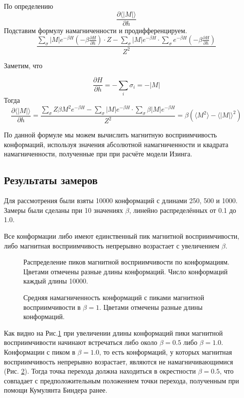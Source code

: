 \documentclass[a4paper,12pt]{article}
\begin{document}
По определению
\[
\frac{\partial\langle |M|\rangle}{\partial h}
\]
Подставим формулу намагниченности и продифференцируем.
\[
\frac{\sum_\sigma {|M| e^{-\beta H} \left( -\beta \frac{\partial H}{\partial h}\right)} \cdot Z - \sum_\sigma {|M| e^{-\beta H}} \cdot \sum_\sigma {e^{-\beta H} \left( -\beta \frac{\partial H}{\partial h}\right)}}{Z^2}
\] 

Заметим, что 

\[
\frac{\partial H}{\partial h} = -\sum_i\sigma_i = -|M|
\]
Тогда
\[
\frac{\partial\langle |M|\rangle}{\partial h} = \frac{\sum_\sigma {Z\beta M^2 e^{-\beta H}} - \sum_\sigma {|M| e^{-\beta H}}\cdot \sum_\sigma {\beta |M| e^{-\beta H}}}{Z^2} = \beta \left(\langle M^2\rangle - \langle |M| \rangle^2 \right)
\]


По данной формуле мы можем вычислить магнитную восприимчивость конформаций, используя значения абсолютной намагниченности и квадрата намагниченности, полученные при при расчёте модели Изинга.

\subsection{Результаты замеров}
Для рассмотрения были взяты 10000 конформаций с длинами 250, 500 и 1000. Замеры были сделаны при 10 значениях $\beta$, линейно распределённых от 0.1 до 1.0. 

Все конформации либо имеют единственный пик магнитной восприимчивости, либо магнитная восприимчивость непрерывно возрастает с увеличением $\beta$.

\begin{figure}[htb]
	\centering	
	
	\caption{Распределение пиков магнитной восприимчивости по конформациям. Цветами отмечены разные длины конформаций. Число конформаций каждый длины 10000. }
	\label{fig:ms_peaks}
\end{figure}


\begin{figure}[hbt]
	\centering
	
	\caption{Средняя намагниченность конформаций с пиками магнитной восприимчивости в $\beta = 1$. Цветами отмечены разные длины конформаций.}
	\label{fig:no_peaks_mag2}
\end{figure}


Как видно на Рис.\ref{fig:ms_peaks} при увеличении длины конформаций пики магнитной восприимчивости начинают встречаться либо около $\beta = 0.5$ либо $\beta = 1.0$. Конформации с пиком в $\beta = 1.0$, то есть конформаций, у которых магнитная восприимчивость непрерывно возрастает, являются не намагничивающимися (Рис. \ref{fig:no_peaks_mag2}). Тогда точка перехода должна находиться в окрестности $\beta = 0.5$, что совпадает с предположительным положением точки перехода, полученным при помощи Кумулянта Биндера \cite{binder_cumulant} ранее. 
\end{document}
